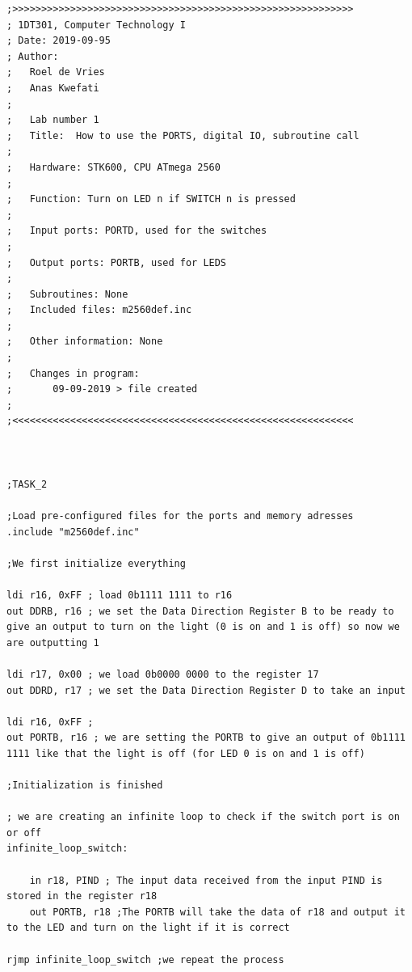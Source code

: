 \documentclass[a4paper,12pt]{article}
\begin{document}
\begin{lstlisting}
;>>>>>>>>>>>>>>>>>>>>>>>>>>>>>>>>>>>>>>>>>>>>>>>>>>>>>>>>>>>
; 1DT301, Computer Technology I
; Date: 2019-09-95
; Author:
;   Roel de Vries
;   Anas Kwefati
;
;	Lab number 1
;	Title:	How to use the PORTS, digital IO, subroutine call
;
;	Hardware: STK600, CPU ATmega 2560
;
;	Function: Turn on LED n if SWITCH n is pressed
;
;	Input ports: PORTD, used for the switches
;
;	Output ports: PORTB, used for LEDS
;
;	Subroutines: None
;	Included files: m2560def.inc
;
;	Other information: None
;
;	Changes in program:
;		09-09-2019 > file created
;
;<<<<<<<<<<<<<<<<<<<<<<<<<<<<<<<<<<<<<<<<<<<<<<<<<<<<<<<<<<<



;TASK_2

;Load pre-configured files for the ports and memory adresses
.include "m2560def.inc"

;We first initialize everything 

ldi r16, 0xFF ; load 0b1111 1111 to r16
out DDRB, r16 ; we set the Data Direction Register B to be ready to give an output to turn on the light (0 is on and 1 is off) so now we are outputting 1

ldi r17, 0x00 ; we load 0b0000 0000 to the register 17
out DDRD, r17 ; we set the Data Direction Register D to take an input  

ldi r16, 0xFF ; 
out PORTB, r16 ; we are setting the PORTB to give an output of 0b1111 1111 like that the light is off (for LED 0 is on and 1 is off) 

;Initialization is finished

; we are creating an infinite loop to check if the switch port is on or off
infinite_loop_switch:

	in r18, PIND ; The input data received from the input PIND is stored in the register r18
	out PORTB, r18 ;The PORTB will take the data of r18 and output it to the LED and turn on the light if it is correct 

rjmp infinite_loop_switch ;we repeat the process


\end{lstlisting}
\end{document}
